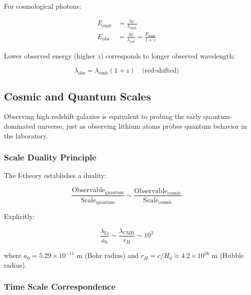 For cosmological photons:

\begin{align}
\label{eq:cosmic_emission}
E_{\text{emit}} &= \frac{hc}{\lambda_{\text{emit}}} \\
\label{eq:cosmic_observation}
E_{\text{obs}} &= \frac{hc}{\lambda_{\text{obs}}} = \frac{E_{\text{emit}}}{1+z}
\end{align}

Lower observed energy (higher $z$) corresponds to longer observed wavelength:

\begin{equation}
\label{eq:redshift_wavelength}
\lambda_{\text{obs}} = \lambda_{\text{emit}}(1+z) \quad \text{(red-shifted)}
\end{equation}

\subsection{Cosmic and Quantum Scales}
\label{subsec:cosmic_quantum_scales}

Observing high redshift galaxies is equivalent to probing the early quantum-dominated universe, just as observing lithium atoms probes quantum behavior in the laboratory.

\subsubsection{Scale Duality Principle}

The I-theory establishes a duality:

\begin{equation}
\label{eq:scale_duality}
\frac{\text{Observable}_{\text{quantum}}}{\text{Scale}_{\text{quantum}}} \sim \frac{\text{Observable}_{\text{cosmic}}}{\text{Scale}_{\text{cosmic}}}
\end{equation}

Explicitly:

\begin{equation}
\label{eq:scale_ratio}
\frac{\lambda_{\text{Li}}}{a_0} \sim \frac{\lambda_{\text{CMB}}}{r_H} \sim 10^3
\end{equation}

where $a_0 = 5.29 \times 10^{-11}$ m (Bohr radius) and $r_H = c/H_0 \approx 4.2 \times 10^{26}$ m (Hubble radius).

\subsubsection{Time Scale Correspondence}


